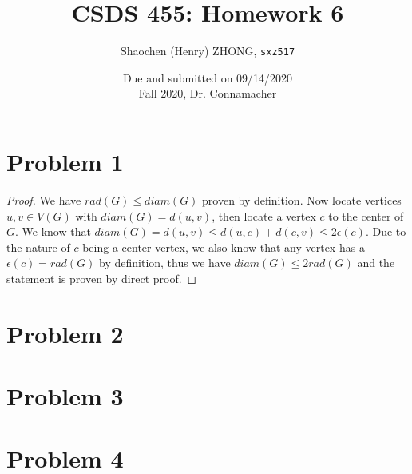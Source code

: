 \documentclass[11pt]{article}
\newcommand{\ilc}{\texttt}
\begin{document}
\title{\textbf{CSDS 455: Homework 6}}

\author{Shaochen (Henry) ZHONG, \ilc{sxz517}}
\date{Due and submitted on 09/14/2020 \\ Fall 2020, Dr. Connamacher}
\maketitle

\section*{Problem 1}

\begin{proof}
We have $rad(G) \leq diam(G)$ proven by definition. Now locate vertices $u, v \in V(G)$ with $diam(G) = d(u, v)$, then locate a vertex $c$ to the center of $G$. We know that $diam(G) = d(u, v) \leq d(u, c) + d(c, v) \leq 2\epsilon(c)$. Due to the nature of $c$ being a center vertex, we also know that any vertex has a $\epsilon(c) = rad(G)$ by definition, thus we have $diam(G) \leq 2rad(G)$ and the statement is proven by direct proof.
\end{proof}

\section*{Problem 2}



\section*{Problem 3}



\section*{Problem 4}



%
% 
% 
\end{document}
